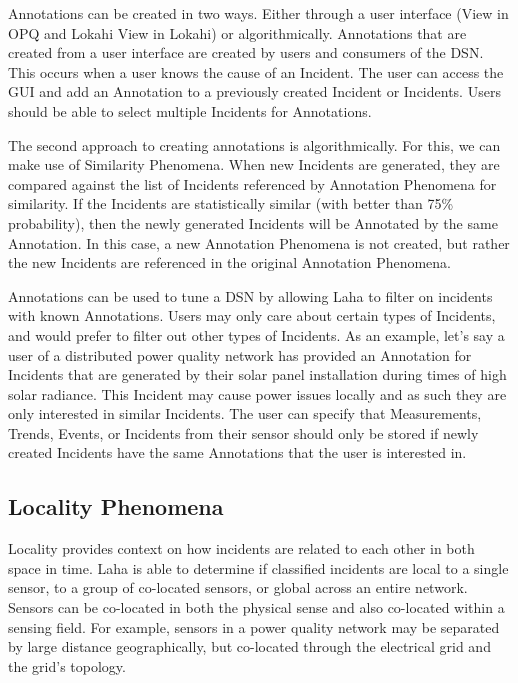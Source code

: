 Annotations can be created in two ways. Either through a user interface (View in OPQ and Lokahi View in Lokahi) or algorithmically. Annotations that are created from a user interface are created by users and consumers of the DSN. This occurs when a user knows the cause of an Incident. The user can access the GUI and add an Annotation to a previously created Incident or Incidents. Users should be able to select multiple Incidents for Annotations.

The second approach to creating annotations is algorithmically. For this, we can make use of Similarity Phenomena. When new Incidents are generated, they are compared against the list of Incidents referenced by Annotation Phenomena for similarity. If the Incidents are statistically similar (with better than 75\% probability), then the newly generated Incidents will be Annotated by the same Annotation. In this case, a new Annotation Phenomena is not created, but rather the new Incidents are referenced in the original Annotation Phenomena.

Annotations can be used to tune a DSN by allowing Laha to filter on incidents with known Annotations. Users may only care about certain types of Incidents, and would prefer to filter out other types of Incidents. As an example, let's say a user of a distributed power quality network has provided an Annotation for Incidents that are generated by their solar panel installation during times of high solar radiance. This Incident may cause power issues locally and as such they are only interested in similar Incidents. The user can specify that Measurements, Trends, Events, or Incidents from their sensor should only be stored if newly created Incidents have the same Annotations that the user is interested in.

\subsection{Locality Phenomena}\label{subsec:locality-phenomena}
Locality provides context on how incidents are related to each other in both space in time. Laha is able to determine if classified incidents are local to a single sensor, to a group of co-located sensors, or global across an entire network. Sensors can be co-located in both the physical sense and also co-located within a sensing field. For example, sensors in a power quality network may be separated by large distance geographically, but co-located through the electrical grid and the grid's topology.

